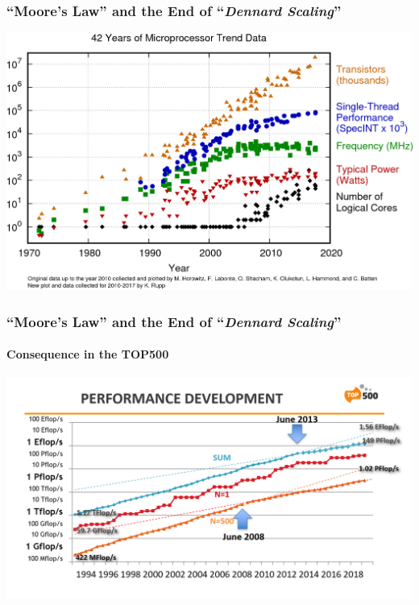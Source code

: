 \documentclass[xcolor={x11names,svgnames,psnames}]{beamer}
\begin{document}
\begin{frame}
  \frametitle{``Moore's Law'' and the End of ``\textit{Dennard Scaling}''}

  \includegraphics[width=\textwidth]{42-years-processor-trend.jpg}
\end{frame}

\begin{frame}
  \frametitle{``Moore's Law'' and the End of ``\textit{Dennard Scaling}''}
  \framesubtitle{Consequence in the TOP500}
  
  \includegraphics[width=\textwidth]{Top500-Dennard-scaling-effect.png}
\end{frame}
\end{document}
